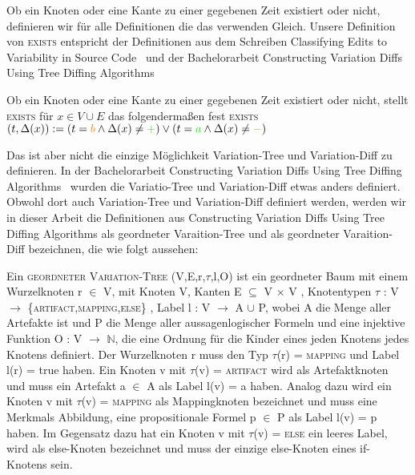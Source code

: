 Ob ein Knoten oder eine Kante zu einer gegebenen Zeit existiert oder nicht, definieren wir für alle Definitionen die das verwenden Gleich. Unsere Definition von \textsc{exists} entspricht der Definitionen aus dem Schreiben Classifying Edits to Variability in Source Code~\cite{BTS+:ESECFSE22} und der Bachelorarbeit Constructing Variation Diffs Using Tree Diffing Algorithms~\cite{Moosherr23}
\begin{definition}
	Ob ein Knoten oder eine Kante zu einer gegebenen Zeit existiert oder nicht, stellt \textsc{exists}  für $x \in V \cup E$ das folgendermaßen fest \textsc{exists}$(t,\Delta(x)) := (t = \textcolor{orange}{b} \land \Delta(x) \neq \textcolor{green}{+}) \lor (t = \textcolor{green}{a} \land \Delta(x) \neq \textcolor{orange}{-})$
\end{definition}

Das ist aber nicht die einzige Möglichkeit Variation-Tree und Variation-Diff zu definieren. In der Bachelorarbeit  Constructing Variation Diffs Using Tree Diffing Algorithms~\cite{Moosherr23} wurden die Variatio-Tree und Variation-Diff etwas anders definiert. Obwohl dort auch Variation-Tree und Variation-Diff definiert werden, werden wir in dieser Arbeit die Definitionen aus Constructing Variation Diffs Using Tree Diffing Algorithms als geordneter Varaition-Tree und als geordneter Varaition-Diff bezeichnen, die wie folgt aussehen:
\begin{definition}
	Ein \textsc{geordneter Variation-Tree} (V,E,r,$\tau$,l,O) ist ein geordneter Baum mit einem Wurzelknoten r $\in$ V, mit Knoten V, Kanten E $\subseteq$ V $\times$ V , Knotentypen $\tau$ : V $\rightarrow$ \{\textsc{artifact,mapping,else}\} , Label l : V $\rightarrow$ A $\cup$ P, wobei A die Menge aller Artefakte ist und P die Menge aller aussagenlogischer Formeln und eine injektive Funktion O : V $\rightarrow$  $\mathbb{N}$, die eine Ordnung für die Kinder eines jeden Knotens jedes Knotens definiert. Der Wurzelknoten r muss den Typ $\tau$(r) = \textsc{mapping} und Label l(r) = true haben. Ein Knoten v mit $\tau$(v) = \textsc{artifact} wird als Artefaktknoten und muss ein Artefakt a $\in$ A als Label l(v) = a haben. Analog dazu wird ein Knoten v mit $\tau$(v) = \textsc{mapping} als Mappingknoten bezeichnet und muss eine Merkmals Abbildung, eine propositionale Formel p $\in$ P als Label l(v) = p haben. Im Gegensatz dazu hat ein Knoten v mit $\tau$(v) = \textsc{else} ein leeres Label, wird als else-Knoten bezeichnet und muss der einzige else-Knoten eines if-Knotens sein. 
	
\end{definition}
	

